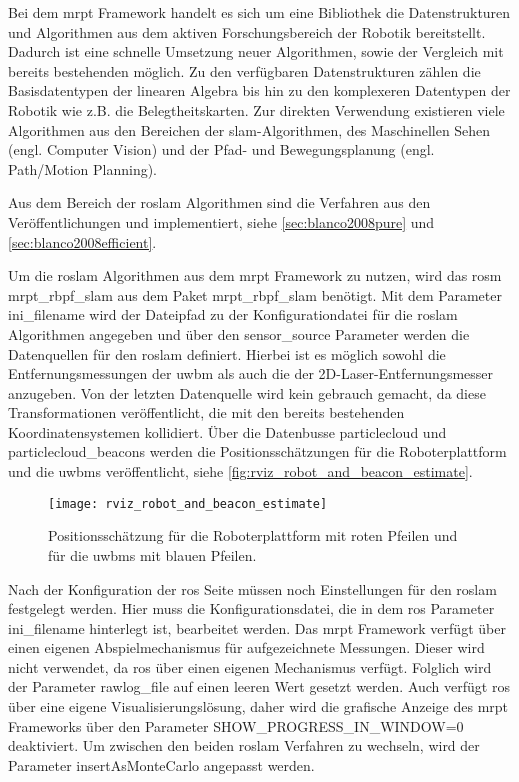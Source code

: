 Bei dem \Gls{mrpt} Framework handelt es sich um eine Bibliothek die Datenstrukturen und Algorithmen aus dem aktiven Forschungsbereich der Robotik bereitstellt. Dadurch ist eine schnelle Umsetzung neuer Algorithmen, sowie der Vergleich mit bereits bestehenden möglich. Zu den verfügbaren Datenstrukturen zählen die Basisdatentypen der linearen Algebra bis hin zu den komplexeren Datentypen der Robotik wie z.B. die Belegtheitskarten. Zur direkten Verwendung existieren viele Algorithmen aus den Bereichen der \Gls{slam}-Algorithmen, des Maschinellen Sehen (engl. Computer Vision) und der Pfad- und Bewegungsplanung (engl. Path/Motion Planning).

Aus dem Bereich der \Gls{roslam} Algorithmen sind die Verfahren aus den Veröffentlichungen  und  implementiert, siehe \autoref{sec:blanco2008pure} und \ref{sec:blanco2008efficient}.

Um die \Gls{roslam} Algorithmen aus dem \Gls{mrpt} Framework zu nutzen, wird das \Gls{rosm} mrpt\_rbpf\_slam aus dem Paket mrpt\_rbpf\_slam benötigt. Mit dem Parameter \mbox{ini\_filename} wird der Dateipfad zu der Konfigurationdatei für die \Gls{roslam} Algorithmen angegeben und über den sensor\_source Parameter werden die Datenquellen für den \Gls{roslam} definiert. Hierbei ist es möglich sowohl die Entfernungsmessungen der \Gls{uwbm} als auch die der 2D-Laser-Entfernungsmesser anzugeben. Von der letzten Datenquelle wird kein gebrauch gemacht, da diese Transformationen veröffentlicht, die mit den bereits bestehenden Koordinatensystemen kollidiert. Über die Datenbusse particlecloud und \mbox{particlecloud\_beacons} werden die Positionsschätzungen für die Roboterplattform und die \Glspl{uwbm} veröffentlicht, siehe \autoref{fig:rviz_robot_and_beacon_estimate}.

\begin{figure}
	\centering
	\texttt{[image: rviz\_robot\_and\_beacon\_estimate]}
	\caption{Positionsschätzung für die Roboterplattform mit roten Pfeilen und für die \Glspl{uwbm} mit blauen Pfeilen.}
	\label{fig:rviz_robot_and_beacon_estimate}
\end{figure}

Nach der Konfiguration der \Gls{ros} Seite müssen noch Einstellungen für den \Gls{roslam} festgelegt werden. Hier muss die Konfigurationsdatei, die in dem \Gls{ros} Parameter ini\_filename hinterlegt ist, bearbeitet werden. Das \Gls{mrpt} Framework verfügt über einen eigenen Abspielmechanismus für aufgezeichnete Messungen. Dieser wird nicht verwendet, da \Gls{ros} über einen eigenen Mechanismus verfügt. Folglich wird der Parameter rawlog\_file auf einen leeren Wert gesetzt werden. Auch verfügt \Gls{ros} über eine eigene Visualisierungslösung, daher wird die grafische Anzeige des \Gls{mrpt} Frameworks über den Parameter SHOW\_PROGRESS\_IN\_WINDOW=0 deaktiviert. Um zwischen den beiden \Gls{roslam} Verfahren zu wechseln, wird der Parameter insertAsMonteCarlo angepasst werden.

